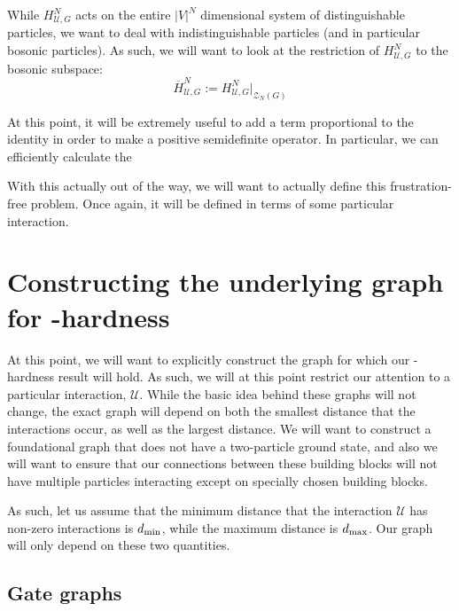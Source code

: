 \documentclass[../thesis-main/thesis-main]{subfiles}
\begin{document}
While $H_{\mathcal{U},G}^N$ acts on the entire $|V|^N$ dimensional system of distinguishable particles, we want to deal with indistinguishable particles (and in particular bosonic particles).  As such, we will want to look at the restriction of $H_{\mathcal{U},G}^N$ to the bosonic subspace:
\begin{equation}
  \overline{H}_{\mathcal{U},G}^N := H_{\mathcal{U},G}^N \big|_{\mathcal{Z}_N(G)}
\end{equation}


At this point, it will be extremely useful to add a term proportional to the identity in order to make a positive semidefinite operator. In particular, we can efficiently calculate the 


With this actually out of the way, we will want to actually define this frustration-free problem.  Once again, it will be defined in terms of some particular interaction.  



\section{Constructing the underlying graph for \QMA-hardness}

At this point, we will want to explicitly construct the graph for which our \QMA-hardness result will hold.  As such, we will at this point restrict our attention to a particular interaction, $\mathcal{U}$.  While the basic idea behind these graphs will not change, the exact graph will depend on both the smallest distance that the interactions occur, as well as the largest distance.  We will want to construct a foundational graph that does not have a two-particle ground state, and also we will want to ensure that our connections between these building blocks will not have multiple particles interacting except on specially chosen building blocks.

As such, let us assume that the minimum distance that the interaction $\mathcal{U}$ has non-zero interactions is $d_{\text{min}}$, while the maximum distance is $d_{\text{max}}$.  Our graph will only depend on these two quantities.

\subsection{Gate graphs}
\end{document}
